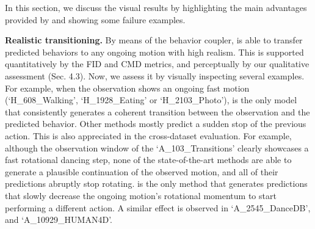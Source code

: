\documentclass[10pt,twocolumn,letterpaper]{article}
\begin{document}
In this section, we discuss the visual results by highlighting the main advantages provided by \modelname{} and showing some failure examples.



\textbf{Realistic transitioning. } By means of the behavior coupler, \modelname{} is able to transfer predicted behaviors to any ongoing motion with high realism. This is supported quantitatively by the FID and CMD metrics, and perceptually by our qualitative assessment (Sec. 4.3). Now, we assess it by visually inspecting several examples. For example, when the observation shows an ongoing fast motion (`H\_608\_Walking', `H\_1928\_Eating' or `H\_2103\_Photo'), \modelname{} is the only model that consistently generates a coherent transition between the observation and the predicted behavior. Other methods mostly predict a sudden stop of the previous action. This is also appreciated in the cross-dataset evaluation. For example, although the observation window of the `A\_103\_Transitions' clearly showcases a fast rotational dancing step, none of the state-of-the-art methods are able to generate a plausible continuation of the observed motion, and all of their predictions abruptly stop rotating. \modelname{} is the only method that generates predictions that slowly decrease the ongoing motion's rotational momentum to start performing a different action. A similar effect is observed in `A\_2545\_DanceDB', and `A\_10929\_HUMAN4D'.
\end{document}

